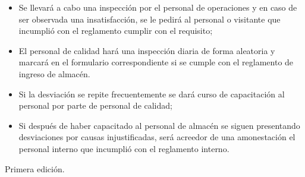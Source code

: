 \begin{itemize}
    \item Se llevará a cabo una inspección por el personal de operaciones y en caso de ser observada una insatisfacción, se le pedirá al personal o visitante que incumplió con el reglamento cumplir con el requisito;
    \item El personal de calidad hará una inspección diaria de forma aleatoria y marcará en el formulario correspondiente si se cumple con el reglamento de ingreso de almacén.
    \item Si la desviación se repite frecuentemente se dará curso de capacitación al personal por parte de personal de calidad;
    \item Si después de haber capacitado al personal de almacén se siguen presentando desviaciones por causas injustificadas, será acreedor de una amonestación el personal interno que incumplió con el reglamento interno.
\end{itemize}


\begin{changelog}[simple, sectioncmd=\subsection*,label=changelog-1.0]
    \begin{version}[v=1.0, date=2023--01, author=Pablo E. Alanis]
        \item Primera edición.
    \end{version}
\end{changelog}